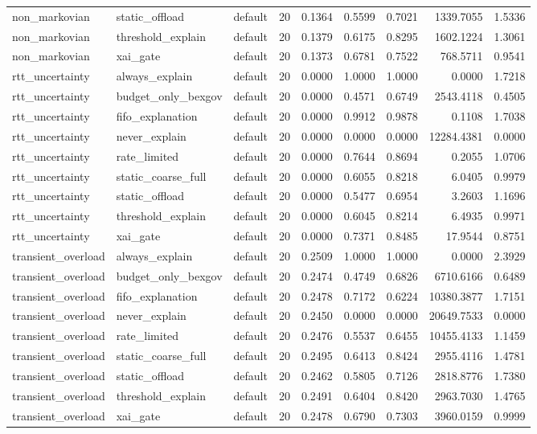 \begin{table}[t]
\begin{tabular}{lllrrrrrr}
non\_markovian & static\_offload & default & 20 & 0.1364 & 0.5599 & 0.7021 & 1339.7055 & 1.5336 \\
non\_markovian & threshold\_explain & default & 20 & 0.1379 & 0.6175 & 0.8295 & 1602.1224 & 1.3061 \\
non\_markovian & xai\_gate & default & 20 & 0.1373 & 0.6781 & 0.7522 & 768.5711 & 0.9541 \\
rtt\_uncertainty & always\_explain & default & 20 & 0.0000 & 1.0000 & 1.0000 & 0.0000 & 1.7218 \\
rtt\_uncertainty & budget\_only\_bexgov & default & 20 & 0.0000 & 0.4571 & 0.6749 & 2543.4118 & 0.4505 \\
rtt\_uncertainty & fifo\_explanation & default & 20 & 0.0000 & 0.9912 & 0.9878 & 0.1108 & 1.7038 \\
rtt\_uncertainty & never\_explain & default & 20 & 0.0000 & 0.0000 & 0.0000 & 12284.4381 & 0.0000 \\
rtt\_uncertainty & rate\_limited & default & 20 & 0.0000 & 0.7644 & 0.8694 & 0.2055 & 1.0706 \\
rtt\_uncertainty & static\_coarse\_full & default & 20 & 0.0000 & 0.6055 & 0.8218 & 6.0405 & 0.9979 \\
rtt\_uncertainty & static\_offload & default & 20 & 0.0000 & 0.5477 & 0.6954 & 3.2603 & 1.1696 \\
rtt\_uncertainty & threshold\_explain & default & 20 & 0.0000 & 0.6045 & 0.8214 & 6.4935 & 0.9971 \\
rtt\_uncertainty & xai\_gate & default & 20 & 0.0000 & 0.7371 & 0.8485 & 17.9544 & 0.8751 \\
transient\_overload & always\_explain & default & 20 & 0.2509 & 1.0000 & 1.0000 & 0.0000 & 2.3929 \\
transient\_overload & budget\_only\_bexgov & default & 20 & 0.2474 & 0.4749 & 0.6826 & 6710.6166 & 0.6489 \\
transient\_overload & fifo\_explanation & default & 20 & 0.2478 & 0.7172 & 0.6224 & 10380.3877 & 1.7151 \\
transient\_overload & never\_explain & default & 20 & 0.2450 & 0.0000 & 0.0000 & 20649.7533 & 0.0000 \\
transient\_overload & rate\_limited & default & 20 & 0.2476 & 0.5537 & 0.6455 & 10455.4133 & 1.1459 \\
transient\_overload & static\_coarse\_full & default & 20 & 0.2495 & 0.6413 & 0.8424 & 2955.4116 & 1.4781 \\
transient\_overload & static\_offload & default & 20 & 0.2462 & 0.5805 & 0.7126 & 2818.8776 & 1.7380 \\
transient\_overload & threshold\_explain & default & 20 & 0.2491 & 0.6404 & 0.8420 & 2963.7030 & 1.4765 \\
transient\_overload & xai\_gate & default & 20 & 0.2478 & 0.6790 & 0.7303 & 3960.0159 & 0.9999 \\
\bottomrule
\end{tabular}
\end{table}
